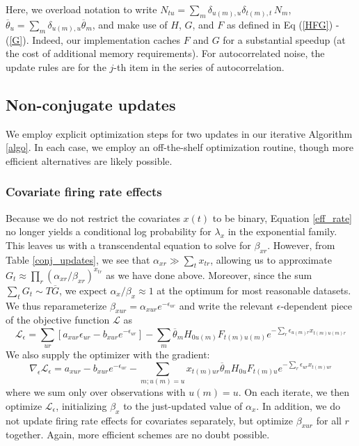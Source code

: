 Here, we overload notation to write $N_{tu} = \sum_m \delta_{u(m), u} \delta_{t(m), t}\, N_m$, $\overline{\theta}_u = \sum_m \delta_{u(m), u}\overline{\theta}_m$, and make use of $H$, $G$, and $F$ as defined in Eq (\ref{HFG}) - (\ref{G}). Indeed, our implementation caches $F$ and $G$ for a substantial speedup (at the cost of additional memory requirements). For autocorrelated noise, the update rules are for the $j$-th item in the series of autocorrelation.

\subsection{Non-conjugate updates}
\label{non-conj}
We employ explicit optimization steps for two updates in our iterative Algorithm \ref{algo}. In each case, we employ an off-the-shelf optimization routine, though more efficient alternatives are likely possible.

\subsubsection{Covariate firing rate effects}
\label{beta_x}
Because we do not restrict the covariates $x(t)$ to be binary, Equation \ref{eff_rate} no longer yields a conditional log probability for $\lambda_x$ in the exponential family. This leaves us with a transcendental equation to solve for $\beta_{xr}$. However, from Table \ref{conj_updates}, we see that $\alpha_{xr} \gg \sum_t x_{tr}$, allowing us to approximate $G_t \approx \prod_r (\alpha_{xr}/\beta_{xr})^{x_{tr}}$ as we have done above. Moreover, since the sum $\sum_t G_t \sim T\overline{G}$, we expect $\alpha_x / \beta_x \approx 1$ at the optimum for most reasonable datasets. We thus reparameterize $\beta_{xur} = \alpha_{xur}e^{-\epsilon_{ur}}$ and write the relevant $\epsilon$-dependent piece of the objective function $\mathcal{L}$ as
\begin{equation}
    \mathcal{L}_\epsilon = \sum_{ur} \left[a_{xur}\epsilon_{ur} - b_{xur}e^{-\epsilon_{ur}} \right] - \sum_m \overline{\theta}_m H_{0u(m)} F_{t(m)u(m)}
    e^{-\sum_r \epsilon_{u(m)r} x_{t(m)u(m)r}}
\end{equation}
We also supply the optimizer with the gradient:
\begin{equation}
    \nabla_\epsilon \mathcal{L}_\epsilon = a_{xur} - b_{xur}e^{-\epsilon_{ur}}  - \sum_{m; u(m) = u} x_{t(m)ur} \overline{\theta}_m H_{0u} F_{t(m)u}
    e^{-\sum_r \epsilon_{ur} x_{t(m)ur}}
\end{equation}
where we sum only over observations with $u(m) = u$. On each iterate, we then optimize $\mathcal{L}_\epsilon$, initializing $\beta_x$ to the just-updated value of $\alpha_x$. In addition, we do not update firing rate effects for covariates separately, but optimize $\beta_{xur}$ for all $r$ together. Again, more efficient schemes are no doubt possible.

